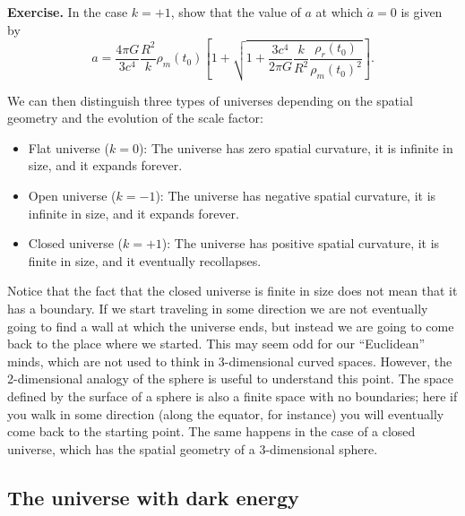 \par\vspace{\baselineskip}

{\bf Exercise.} In the case $k=+1$, show that the value of $a$ at which $\dot{a}=0$ is given by
\begin{equation}
a=\frac{4\pi G}{3c^4}\frac{R^2}{k}\rho_m(t_0)\left[1+\sqrt{1+\frac{3c^4}{2\pi G}\frac{k}{R^2}\frac{\rho_r(t_0)}{\rho_m(t_0)^2}}\right].
\end{equation}

\par\vspace{\baselineskip}

We can then distinguish three types of universes depending on the spatial geometry and the evolution of the scale factor:
\begin{itemize}
\item Flat universe ($k=0$): The universe has zero spatial curvature, it is infinite in size, and it expands forever.
\item Open universe ($k=-1$): The universe has negative spatial curvature, it is infinite in size, and it expands forever.
\item Closed universe ($k=+1$): The universe has positive spatial curvature, it is finite in size, and it eventually recollapses.
\end{itemize}
Notice that the fact that the closed universe is finite in size does not mean that it has a boundary. If we start traveling in some direction we are not eventually going to find a wall at which the universe ends, but instead we are going to come back to the place where we started. This may seem odd for our ``Euclidean'' minds, which are not used to think in 3-dimensional curved spaces. However, the 2-dimensional analogy of the sphere is useful to understand this point. The space defined by the surface of a sphere is also a finite space with no boundaries; here if you walk in some direction (along the equator, for instance) you will eventually come back to the starting point. The same happens in the case of a closed universe, which has the spatial geometry of a 3-dimensional sphere.

\subsection{The universe with dark energy}

